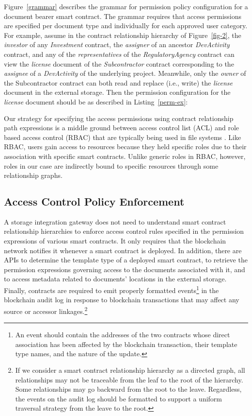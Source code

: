 Figure~\ref{grammar} describes the grammar for permission policy configuration for a document bearer smart contract. The grammar requires that access permissions are specified per document type and individually for each approved user category. For example, assume in the contract relationship hierarchy of Figure~\ref{fig-2}, the {\it investor} of any {\it Investment} contract, the {\it assigner} of an ancestor {\it DevActivity} contract, and any of the {\it representatives} of the {\it RegulatoryAgency} contract can view the {\it license} document of the {\it Subcontractor} contract corresponding to the {\it assignee} of a {\it DevActivity} of the underlying project. Meanwhile, only the {\it owner} of the {Subcontractor} contract can both read and replace (i.e., write) the {\it license} document in the external storage. Then the permission configuration for the {\it license} document should be as described in Listing~\ref{perm-ex}:
\lstset{caption=Example access permission configuration, label=perm-ex}

Our strategy for specifying the access permissions using contract relationship path expressions is a middle ground between access control list (ACL) and role based access control (RBAC) that are typically being used in file systems \cite{Barkley:1997:CSR:266741.266769}. Like RBAC, users gain access to resources because they held specific roles due to their association with specific smart contracts. Unlike generic roles in RBAC, however, roles in our case are indirectly bound to specific resources through some relationship graphs.       

\subsection{Access Control Policy Enforcement}
A storage integration gateway does not need to understand smart contract relationship hierarchies to enforce access control rules specified in the permission expressions of various smart contracts. It only requires that the blockchain network notifies it whenever a smart contract is deployed. In addition, there are APIs to determine the template type of a deployed smart contract, to retrieve the permission expressions governing access to the documents associated with it, and to access metadata related to documents' locations in the external storage. Finally, contracts are required to emit properly formatted events\footnote{An event should contain the addresses of the two contracts whose direct association has been affected by the blockchain transaction, their template type names, and the nature of the update.} in the blockchain audit log in response to blockchain transactions that may affect any source or accessor linkages.\footnote{If we consider a smart contract relationship hierarchy as a directed graph, all relationships may not be traceable from the leaf to the root of the hierarchy. Some relationships may go backward from the root to the leave. Regardless, the events on the audit log should be formatted to support a uniform traversal strategy from the leave to the root.}

